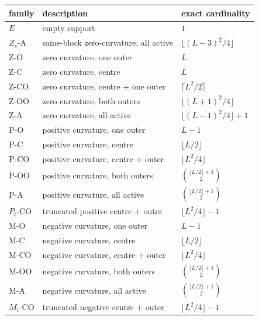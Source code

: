 \documentclass[
  british,
  a4paper,
  11pt]{article}
\newcounter{none} %
\begin{document}
{\def\LTcaptype{none} %
\begin{longtable}[]{@{}
  >{\raggedright\arraybackslash}p{}
  >{\raggedright\arraybackslash}p{}
  >{\raggedleft\arraybackslash}p{}@{}}
\toprule\noalign{}
\begin{minipage}[b]{\linewidth}\raggedright
family
\end{minipage} & \begin{minipage}[b]{\linewidth}\raggedright
description
\end{minipage} & \begin{minipage}[b]{\linewidth}\raggedleft
exact cardinality
\end{minipage} \\
\midrule\noalign{}
\endhead
\bottomrule\noalign{}
\endlastfoot
\(E\) & empty support & \(1\) \\
\(Z_s\)-A & same-block zero-curvature, all active &
\(\lfloor(L-3)^2/4\rfloor\) \\
Z-O & zero curvature, one outer & \(L\) \\
Z-C & zero curvature, centre & \(L\) \\
Z-CO & zero curvature, centre + one outer & \(\lceil L^2/2\rceil\) \\
Z-OO & zero curvature, both outers & \(\lfloor(L+1)^2/4\rfloor\) \\
Z-A & zero curvature, all active & \(\lfloor(L-1)^2/4\rfloor+1\) \\
P-O & positive curvature, one outer & \(L-1\) \\
P-C & positive curvature, centre & \(\lfloor L/2\rfloor\) \\
P-CO & positive curvature, centre + outer & \(\lfloor L^2/4\rfloor\) \\
P-OO & positive curvature, both outers &
\(\binom{\lfloor L/2\rfloor+1}{2}\) \\
P-A & positive curvature, all active &
\(\binom{\lfloor L/2\rfloor+1}{2}\) \\
\(P_t\)-CO & truncated positive centre + outer &
\(\lfloor L^2/4\rfloor-1\) \\
M-O & negative curvature, one outer & \(L-1\) \\
M-C & negative curvature, centre & \(\lfloor L/2\rfloor\) \\
M-CO & negative curvature, centre + outer & \(\lfloor L^2/4\rfloor\) \\
M-OO & negative curvature, both outers &
\(\binom{\lfloor L/2\rfloor+1}{2}\) \\
M-A & negative curvature, all active &
\(\binom{\lfloor L/2\rfloor+1}{2}\) \\
\(M_t\)-CO & truncated negative centre + outer &
\(\lfloor L^2/4\rfloor-1\) \\
\end{longtable}
}
\end{document}
